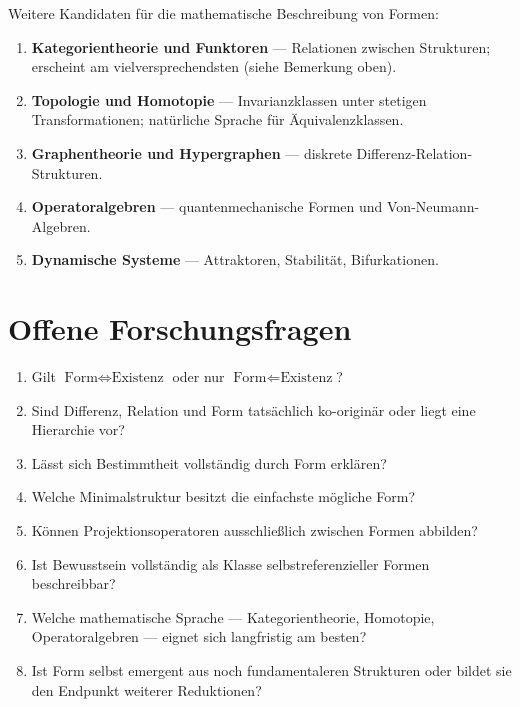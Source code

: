 \documentclass[11pt,a4paper]{article}
\theoremstyle{plain}
\theoremstyle{definition}
\begin{document}
Weitere Kandidaten f\"{u}r die mathematische Beschreibung von Formen:

\begin{enumerate}
  \item \textbf{Kategorientheorie und Funktoren} --- Relationen zwischen Strukturen;
        erscheint am vielversprechendsten (siehe Bemerkung oben).
  \item \textbf{Topologie und Homotopie} --- Invarianzklassen unter stetigen
        Transformationen; nat\"{u}rliche Sprache f\"{u}r \"{A}quivalenzklassen.
  \item \textbf{Graphentheorie und Hypergraphen} --- diskrete
        Differenz-Relation-Strukturen.
  \item \textbf{Operatoralgebren} --- quantenmechanische Formen und
        Von-Neumann-Algebren.
  \item \textbf{Dynamische Systeme} --- Attraktoren, Stabilit\"{a}t, Bifurkationen.
\end{enumerate}

\section{Offene Forschungsfragen}

\begin{enumerate}
  \item Gilt $\text{Form} \Longleftrightarrow \text{Existenz}$ oder nur
        $\text{Form} \Longleftarrow \text{Existenz}$?
  \item Sind Differenz, Relation und Form tats\"{a}chlich ko-origin\"{a}r oder
        liegt eine Hierarchie vor?
  \item L\"{a}sst sich Bestimmtheit vollst\"{a}ndig durch Form erkl\"{a}ren?
  \item Welche Minimalstruktur besitzt die einfachste m\"{o}gliche Form?
  \item K\"{o}nnen Projektionsoperatoren ausschlie\ss{}lich zwischen Formen abbilden?
  \item Ist Bewusstsein vollst\"{a}ndig als Klasse selbstreferenzieller Formen
        beschreibbar?
  \item Welche mathematische Sprache --- Kategorientheorie, Homotopie,
        Operatoralgebren --- eignet sich langfristig am besten?
  \item Ist Form selbst emergent aus noch fundamentaleren Strukturen oder bildet
        sie den Endpunkt weiterer Reduktionen?
\end{enumerate}
\end{document}
